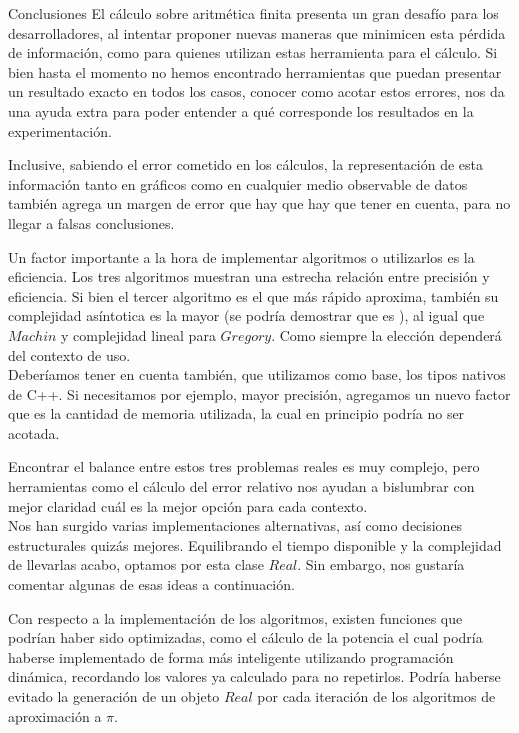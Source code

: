 \begin{section}{Conclusiones}
	El cálculo sobre aritmética finita presenta un gran desafío para los desarrolladores, al intentar proponer nuevas maneras que minimicen esta pérdida de información, como para quienes utilizan estas herramienta para el cálculo. Si bien hasta el momento no hemos encontrado herramientas que puedan presentar un resultado exacto en todos los casos, conocer como acotar estos errores, nos da una ayuda extra para poder entender a qué corresponde los resultados en la experimentación.

	Inclusive, sabiendo el error cometido en los cálculos, la representación de esta información tanto en gráficos como en cualquier medio observable de datos también agrega un margen de error que hay que hay que tener en cuenta, para no llegar a falsas conclusiones.
	
	Un factor importante a la hora de implementar algoritmos o utilizarlos es la eficiencia. Los tres algoritmos muestran una estrecha relación entre precisión y eficiencia. Si bien el tercer algoritmo es el que más rápido aproxima, también su complejidad asíntotica es la mayor (se podría demostrar que es ), al igual que $Machin$ y complejidad lineal para $Gregory$. Como siempre la elección dependerá del contexto de uso.\\
	
	Deberíamos tener en cuenta también, que utilizamos como base, los tipos nativos de C++. Si necesitamos por ejemplo, mayor precisión, agregamos un nuevo factor que es la cantidad de memoria utilizada, la cual en principio podría no ser acotada.
	
	Encontrar el balance entre estos tres problemas reales es muy complejo, pero herramientas como el cálculo del error relativo nos ayudan a bislumbrar con mejor claridad cuál es la mejor opción para cada contexto.\\
	
	Nos han surgido varias implementaciones alternativas, así como decisiones estructurales quizás mejores. Equilibrando el tiempo disponible y la complejidad de llevarlas acabo, optamos por esta clase $Real$. Sin embargo, nos gustaría comentar algunas de esas ideas a continuación.
	
	Con respecto a la implementación de los algoritmos, existen funciones que podrían haber sido optimizadas, como el cálculo de la potencia el cual podría haberse implementado de forma más inteligente utilizando programación dinámica, recordando los valores ya calculado para no repetirlos. Podría haberse evitado la generación de un objeto $Real$ por cada iteración de los algoritmos de aproximación a $\pi$.


\end{section}
